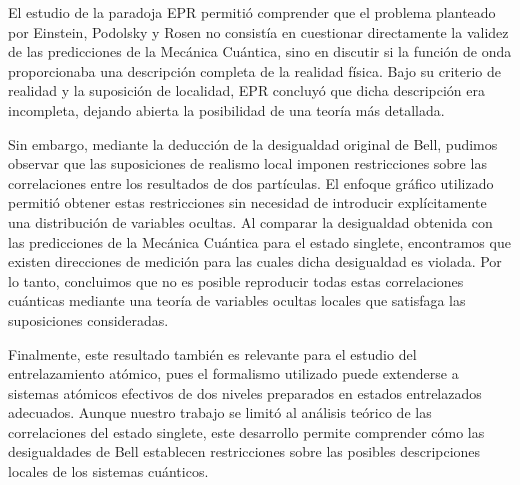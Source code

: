 
El estudio de la paradoja EPR permitió comprender que el problema planteado por Einstein, Podolsky y Rosen no consistía en cuestionar directamente la validez de las predicciones de la Mecánica Cuántica, sino en discutir si la función de onda proporcionaba una descripción completa de la realidad física. Bajo su criterio de realidad y la suposición de localidad, EPR concluyó que dicha descripción era incompleta, dejando abierta la posibilidad de una teoría más detallada.

Sin embargo, mediante la deducción de la desigualdad original de Bell, pudimos observar que las suposiciones de realismo local imponen restricciones sobre las correlaciones entre los resultados de dos partículas. El enfoque gráfico utilizado permitió obtener estas restricciones sin necesidad de introducir explícitamente una distribución de variables ocultas. Al comparar la desigualdad obtenida con las predicciones de la Mecánica Cuántica para el estado singlete, encontramos que existen direcciones de medición para las cuales dicha desigualdad es violada. Por lo tanto, concluimos que no es posible reproducir todas estas correlaciones cuánticas mediante una teoría de variables ocultas locales que satisfaga las suposiciones consideradas.

Finalmente, este resultado también es relevante para el estudio del entrelazamiento atómico, pues el formalismo utilizado puede extenderse a sistemas atómicos efectivos de dos niveles preparados en estados entrelazados adecuados. Aunque nuestro trabajo se limitó al análisis teórico de las correlaciones del estado singlete, este desarrollo permite comprender cómo las desigualdades de Bell establecen restricciones sobre las posibles descripciones locales de los sistemas cuánticos.
